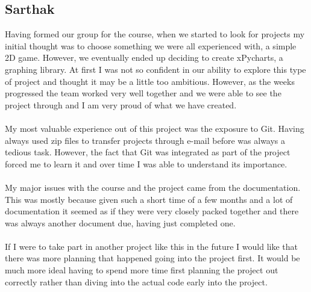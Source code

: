 \documentclass{article}
\begin{document}
\subsection{Sarthak}
Having formed our group for the course, when we started to look for projects my initial thought was to choose something we were all experienced with, a simple 2D game. However, we eventually ended up deciding to create xPycharts, a graphing library. At first I was not so confident in our ability to explore this type of project and thought it may be a little too ambitious. However, as the weeks progressed the team worked very well together and we were able to see the project through and I am very proud of what we have created.\\\\
My most valuable experience out of this project was the exposure to Git. Having always used zip files to transfer projects through e-mail before was always a tedious task. However, the fact that Git was integrated as part of the project forced me to learn it and over time I was able to understand its importance.\\\\
My major issues with the course and the project came from the documentation. This was mostly because given such a short time of a few months and a lot of documentation it seemed as if they were very closely packed together and there was always another document due, having just completed one.\\\\
If I were to take part in another project like this in the future I would like that there was more planning that happened going into the project first. It would be much more ideal having to spend more time first planning the project out correctly rather than diving into the actual code early into the project.
\end{document}
